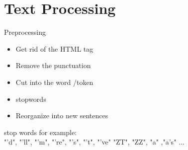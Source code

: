 \documentclass[
 size=12pt,
 paper=smartboard, %
 mode=present, %
 display=slides, %
style=tuliplab,
pauseslide,
fleqn,leqno]{powerdot}
\begin{document}
\section{Text Processing}

\begin{slide}{Preprocessing}
\vspace{1cm}
\begin{itemize}
  \item Get rid of the HTML tag
  \item Remove the punctuation
  \item Cut into the word /token
  \item stopwords
  \item Reorganize into new sentences
\end{itemize}
\vspace{1cm}

stop words for example:\\
"'d",  "'ll",  "'m",  "'re",  "'s",  "'t",  "'ve"  "ZT",  "ZZ", "a" ,"a's"  ...
 

\end{slide}
\end{document}
